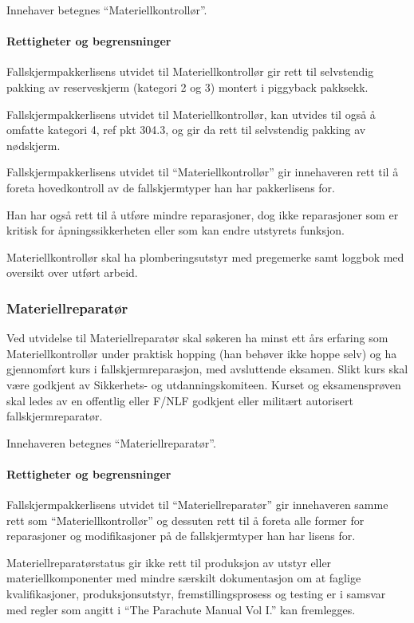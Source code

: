 Innehaver betegnes ``Materiellkontrollør''.

\paragraph{Rettigheter og begrensninger}
Fallskjermpakkerlisens utvidet til Materiellkontrollør gir rett til selvstendig pakking av reserveskjerm (kategori 2 og 3) montert i piggyback pakksekk.

Fallskjermpakkerlisens utvidet til Materiellkontrollør, kan utvides til også å omfatte kategori 4, ref pkt 304.3, og gir da rett til selvstendig pakking av nødskjerm.

Fallskjermpakkerlisens utvidet til ``Materiellkontrollør'' gir innehaveren rett til å foreta hovedkontroll av de fallskjermtyper han har pakkerlisens for.

Han har også rett til å utføre mindre reparasjoner, dog ikke reparasjoner som er kritisk for åpningssikkerheten eller som kan endre utstyrets funksjon.

Materiellkontrollør skal ha plomberingsutstyr med pregemerke samt loggbok med oversikt over utført arbeid.

\subsubsection{Materiellreparatør}
Ved utvidelse til Materiellreparatør skal søkeren ha minst ett års erfaring som Materiellkontrollør under praktisk hopping (han behøver ikke hoppe selv) og ha gjennomført kurs i fallskjermreparasjon, med avsluttende eksamen. Slikt kurs skal være godkjent av Sikkerhets- og utdanningskomiteen. Kurset og eksamensprøven skal ledes av en offentlig eller F/NLF godkjent eller militært autorisert fallskjermreparatør.

Innehaveren betegnes ``Materiellreparatør''.

\paragraph{Rettigheter og begrensninger}
Fallskjermpakkerlisens utvidet til ``Materiellreparatør'' gir innehaveren samme rett som ``Materiellkontrollør'' og dessuten rett til å foreta alle former for reparasjoner og modifikasjoner på de fallskjermtyper han har lisens for.

Materiellreparatørstatus gir ikke rett til produksjon av utstyr eller materiellkomponenter med mindre særskilt dokumentasjon om at faglige kvalifikasjoner, produksjonsutstyr, fremstillingsprosess og testing er i samsvar med regler som angitt i ``The Parachute Manual Vol I.'' kan fremlegges.

